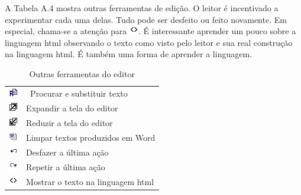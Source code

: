 A Tabela A.4 mostra outras ferramentas de edição. O leitor é incentivado a experimentar cada uma delas. Tudo pode ser desfeito ou feito novamente. Em especial, chama-se a atenção para \includegraphics[width=0.4cm]{imagem/cap0/ed_html.jpg}. É interessante aprender um pouco sobre a linguagem html observando o texto como visto pelo leitor e sua real construção na linguagem html. É também uma forma de aprender a linguagem.

\begin{table}
\begin{center}
 \begin{tabular}{m{0.5cm} m{6.0cm}} \\
  \includegraphics[width=0.4cm]{imagem/cap0/ed_replace.jpg} & \ Procurar e substituir texto \\
  \includegraphics[width=0.4cm]{imagem/cap0/fullscreen_maximize.jpg} & Expandir a tela do editor \\
  \includegraphics[width=0.4cm]{imagem/cap0/fullscreen_minimize.jpg} & Reduzir a tela do editor \\
  \includegraphics[width=0.4cm]{imagem/cap0/ed_wordclean.jpg} & Limpar textos produzidos em Word \\
  \includegraphics[width=0.4cm]{imagem/cap0/ed_undo.jpg} & Desfazer a última ação \\
  \includegraphics[width=0.4cm]{imagem/cap0/ed_redo.jpg} & Repetir a última ação \\
  \includegraphics[width=0.4cm]{imagem/cap0/ed_html.jpg} & Mostrar o texto na linguagem html \\ \hline
 \end{tabular}
\caption{Outras ferramentas do editor}
\end{center}
\end{table}

